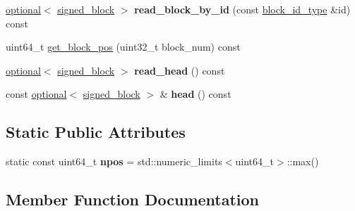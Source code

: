 \begin{DoxyCompactItemize}
\item 
\mbox{\label{classaacio_1_1chain_1_1block__log_a9e53247caf2b1399f986e0629365bae7}} 
\mbox{\hyperlink{classfc_1_1optional}{optional}}$<$ \mbox{\hyperlink{structaacio_1_1chain_1_1signed__block}{signed\+\_\+block}} $>$ {\bfseries read\+\_\+block\+\_\+by\+\_\+id} (const \mbox{\hyperlink{classfc_1_1sha256}{block\+\_\+id\+\_\+type}} \&id) const
\item 
uint64\+\_\+t \mbox{\hyperlink{classaacio_1_1chain_1_1block__log_a040e2584209a518f62aef3828c731166}{get\+\_\+block\+\_\+pos}} (uint32\+\_\+t block\+\_\+num) const
\item 
\mbox{\label{classaacio_1_1chain_1_1block__log_a78c4cd536cdcc292dd2a3383a9a8ff48}} 
\mbox{\hyperlink{classfc_1_1optional}{optional}}$<$ \mbox{\hyperlink{structaacio_1_1chain_1_1signed__block}{signed\+\_\+block}} $>$ {\bfseries read\+\_\+head} () const
\item 
\mbox{\label{classaacio_1_1chain_1_1block__log_adbca6004caef6a24655006cf47939cda}} 
const \mbox{\hyperlink{classfc_1_1optional}{optional}}$<$ \mbox{\hyperlink{structaacio_1_1chain_1_1signed__block}{signed\+\_\+block}} $>$ \& {\bfseries head} () const
\end{DoxyCompactItemize}
\subsection*{Static Public Attributes}
\begin{DoxyCompactItemize}
\item 
\mbox{\label{classaacio_1_1chain_1_1block__log_a714db869cfb8d438551954b8457bb36b}} 
static const uint64\+\_\+t {\bfseries npos} = std\+::numeric\+\_\+limits$<$uint64\+\_\+t$>$\+::max()
\end{DoxyCompactItemize}


\subsection{Member Function Documentation}
\mbox{\label{classaacio_1_1chain_1_1block__log_a040e2584209a518f62aef3828c731166}} 
